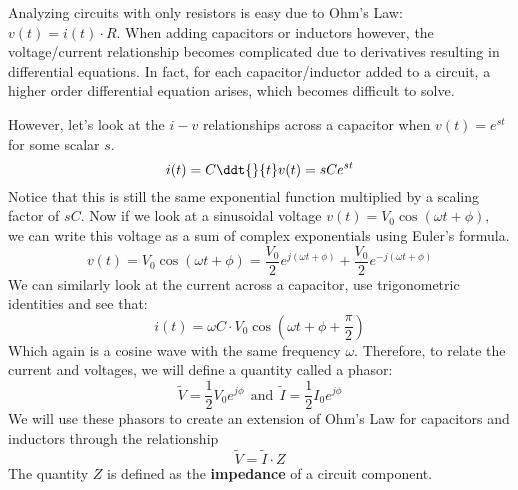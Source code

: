 

Analyzing circuits with only resistors is easy due to Ohm's Law: $v(t)=i(t) \cdot R$.
When adding capacitors or inductors however, the voltage/current relationship becomes complicated due to derivatives resulting in differential equations.
In fact, for each capacitor/inductor added to a circuit, a higher order differential equation arises, which becomes difficult to solve.

However, let's look at the $i-v$ relationships across a capacitor when $v(t) = e^{st}$ for some scalar $s.$
\begin{equation}
i(t) = C\ddt{}{t} v(t) = sC e^{st}
\end{equation}
Notice that this is still the same exponential function multiplied by a scaling factor of $sC.$ \vskip 0.5pt
Now if we look at a sinusoidal voltage $v(t) = V_{0} \cos(\omega{} t+\phi{}),$ we can write this voltage as a sum of complex exponentials using Euler's formula.
\begin{equation}
v(t) = V_{0} \cos(\omega{} t+\phi{}) = \frac{V_{0}}{2} e^{j(\omega{} t + \phi{})} + \frac{V_{0}}{2} e^{-j(\omega{} t + \phi{})}
\end{equation}
We can similarly look at the current across a capacitor, use trigonometric identities and see that:
\begin{equation} 
i(t) = \omega C \cdot V_{0} \cos(\omega{} t + \phi{} + \frac{\pi}{2})
\end{equation}
Which again is a cosine wave with the same frequency $\omega.$ \vskip 0pt
Therefore, to relate the current and voltages, we will define a quantity called a phasor:
\begin{equation}
\widetilde{V} = \frac{1}{2} V_{0} e^{j \phi{}} \ \  \text{and} \ \ \widetilde{I} = \frac{1}{2} I_{0} e^{j \phi{}}
\end{equation}
We will use these phasors to create an extension of Ohm's Law for capacitors and inductors through the relationship
\begin{equation}
\widetilde{V} = \widetilde{I} \cdot Z
\end{equation}
The quantity $Z$ is defined as the \textbf{impedance} of a circuit component.



